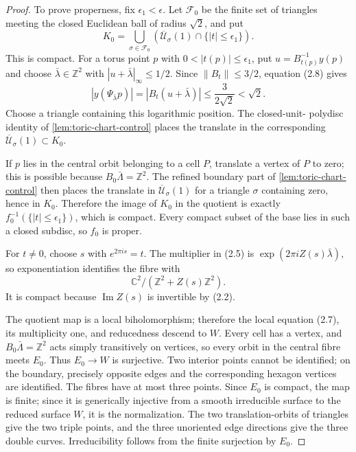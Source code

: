 \begin{proof}
To prove properness, fix \(\epsilon_1<\epsilon\).  Let \(\mathcal F_0\) be
the finite set of triangles meeting the closed Euclidean ball of radius
\(\sqrt2\), and put
\[
 K_0=\bigcup_{\sigma\in\mathcal F_0}
 \left(\overline{\mathcal U}_\sigma(1)
 \cap\{|t|\le\epsilon_1\}\right).
\]
This is compact.  For a torus point \(p\) with
\(0<|t(p)|\le\epsilon_1\), put \(u=B_{t(p)}^{-1}y(p)\) and choose
\(\bar\lambda\in\mathbb Z^2\) with
\(|u+\bar\lambda|_\infty\le1/2\).  Since
\(\|B_t\|\le3/2\), equation (2.8) gives
\[
 |y(\Psi_{\bar\lambda}p)|
 =|B_t(u+\bar\lambda)|
 \le\frac{3}{2\sqrt2}<\sqrt2.
\]
Choose a triangle containing this logarithmic position.  The closed-unit-
polydisc identity of \cref{lem:toric-chart-control} places the translate
in the corresponding
\(\overline{\mathcal U}_\sigma(1)\subset K_0\).

If \(p\) lies in the central orbit belonging to a cell \(P\), translate a
vertex of \(P\) to zero; this is possible because
\(B_0\bar\Lambda=\mathbb Z^2\).  The refined boundary part of
\cref{lem:toric-chart-control} then places the translate in
\(\overline{\mathcal U}_\sigma(1)\) for a triangle \(\sigma\) containing
zero, hence in \(K_0\).  Therefore the image of \(K_0\) in the quotient is
exactly \(f_0^{-1}(\{|t|\le\epsilon_1\})\), which is compact.  Every compact
subset of the base lies in such a closed subdisc, so \(f_0\) is proper.

For \(t\ne0\), choose \(s\) with \(e^{2\pi is}=t\).  The multiplier in
(2.5) is \(\exp(2\pi iZ(s)\bar\lambda)\), so exponentiation identifies the
fibre with
\[
 \mathbb C^2/(\mathbb Z^2+Z(s)\mathbb Z^2).
\]
It is compact because \(\operatorname{Im}Z(s)\) is invertible by (2.2).

The quotient map is a local biholomorphism; therefore the local equation
(2.7), its multiplicity one, and reducedness descend to \(W\).  Every cell
has a vertex, and \(B_0\bar\Lambda=\mathbb Z^2\) acts simply transitively on
vertices, so every orbit in the central fibre meets \(E_0\).  Thus
\(E_0\to W\) is surjective.  Two interior points cannot be identified; on
the boundary, precisely opposite edges and the corresponding hexagon
vertices are identified.  The fibres have at most three points.  Since
\(E_0\) is compact, the map is finite; since it is generically injective
from a smooth irreducible surface to the reduced surface \(W\), it is the
normalization.  The two translation-orbits of triangles give the two triple
points, and the three unoriented edge directions give the three double
curves.  Irreducibility follows from the finite surjection by \(E_0\).


\end{proof}
